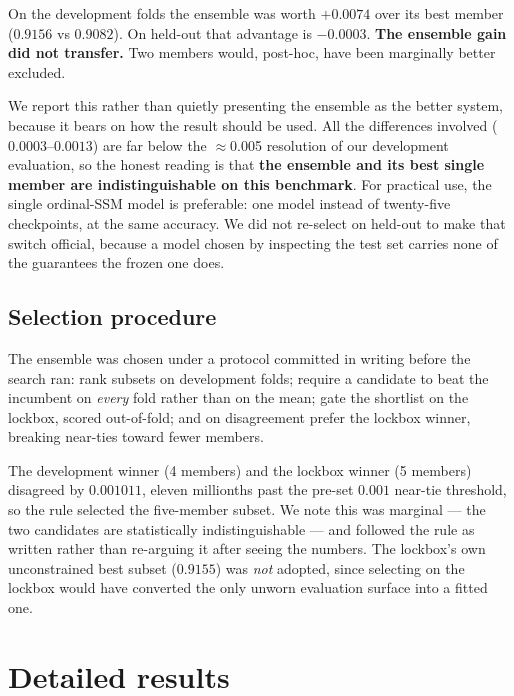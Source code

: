 \documentclass[11pt]{article}
\begin{document}
On the development folds the ensemble was worth $+0.0074$ over its best member
($0.9156$ vs $0.9082$). On held-out that advantage is $-0.0003$. \textbf{The ensemble
gain did not transfer.} Two members would, post-hoc, have been marginally better
excluded.

We report this rather than quietly presenting the ensemble as the better system,
because it bears on how the result should be used. All the differences involved
($0.0003$--$0.0013$) are far below the $\approx$0.005 resolution of our development
evaluation, so the honest reading is that \textbf{the ensemble and its best single
member are indistinguishable on this benchmark}. For practical use, the single
ordinal-SSM model is preferable: one model instead of twenty-five checkpoints, at the
same accuracy. We did not re-select on held-out to make that switch official, because a
model chosen by inspecting the test set carries none of the guarantees the frozen one
does.

\subsection{Selection procedure}

The ensemble was chosen under a protocol committed in writing before the search ran:
rank subsets on development folds; require a candidate to beat the incumbent on
\emph{every} fold rather than on the mean; gate the shortlist on the lockbox, scored
out-of-fold; and on disagreement prefer the lockbox winner, breaking near-ties toward
fewer members.

The development winner (4 members) and the lockbox winner (5 members) disagreed by
$0.001011$, eleven millionths past the pre-set $0.001$ near-tie threshold, so the rule
selected the five-member subset. We note this was marginal --- the two candidates are
statistically indistinguishable --- and followed the rule as written rather than
re-arguing it after seeing the numbers. The lockbox's own unconstrained best subset
($0.9155$) was \emph{not} adopted, since selecting on the lockbox would have converted
the only unworn evaluation surface into a fitted one.

\section{Detailed results}
\end{document}
